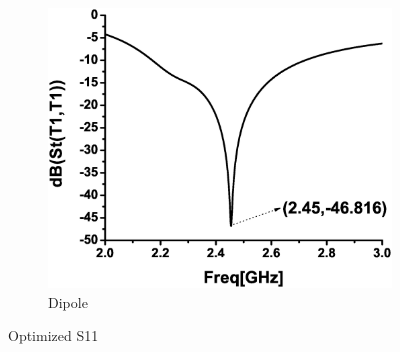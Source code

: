 \documentclass[journal]{IEEEtran}
\begin{document}
\begin{figure}[!htb]
\begin{subfigure}[b]{0.24\textwidth}
\includegraphics[width=\textwidth]{figs/2c.eps}
\caption{Dipole}
\label{fig:2c}
\end{subfigure}
\caption{Optimized S11}
\label{fig:2}
\end{figure}
\end{document}
